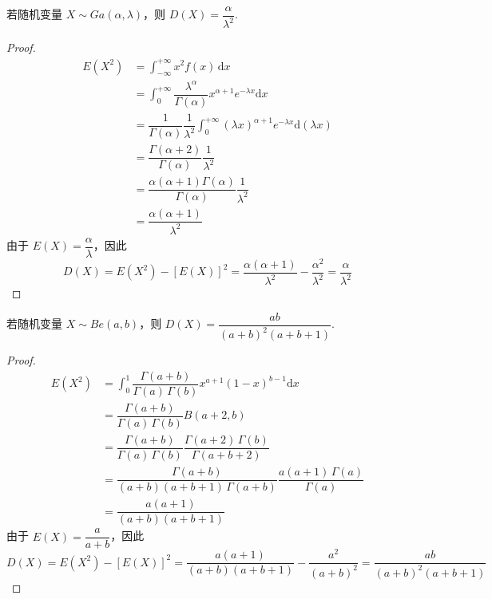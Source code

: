 \begin{conclusion}
    \indent 若随机变量 $X \sim Ga(\alpha,\lambda)$，则 $D(X) = \dfrac{\alpha}{\lambda^2}$.
\end{conclusion}

\begin{proof}
    $$
    \begin{aligned}
        E(X^2) &= \int_{-\infty}^{+\infty} x^2 f(x) \, \mathrm{d}x \\
        &= \int_{0}^{+\infty} \dfrac{\lambda^\alpha}{\Gamma(\alpha)} x^{\alpha + 1} e^{-\lambda x} \mathrm{d}x \\
        &= \dfrac{1}{\Gamma(\alpha)} \dfrac{1}{\lambda^2} \int_{0}^{+\infty} (\lambda x)^{\alpha + 1} e^{-\lambda x} \mathrm{d}(\lambda x) \\
        &= \dfrac{\Gamma(\alpha + 2)}{\Gamma(\alpha)} \dfrac{1}{\lambda^2} \\
        &= \dfrac{\alpha (\alpha + 1) \Gamma(\alpha)}{\Gamma(\alpha)} \dfrac{1}{\lambda^2} \\
        &= \dfrac{\alpha (\alpha + 1)}{\lambda^2}
    \end{aligned}
    $$
    由于 $E(X) = \dfrac{\alpha}{\lambda}$，因此
    $$
    D(X) = E(X^2) - [E(X)]^2 = \dfrac{\alpha (\alpha + 1)}{\lambda^2} - \dfrac{\alpha^2}{\lambda^2} = \dfrac{\alpha}{\lambda^2}
    $$
\end{proof}

\begin{conclusion}
    \indent 若随机变量 $X \sim Be(a,b)$，则 $D(X) = \dfrac{ab}{(a+b)^2 (a+b+1)}$.
\end{conclusion}

\begin{proof}
    $$
    \begin{aligned}
        E(X^2) &= \int_{0}^1 \dfrac{\Gamma(a+b)}{\Gamma(a) \, \Gamma(b)} x^{a+1} (1-x)^{b-1} \mathrm{d}x \\
        &= \dfrac{\Gamma(a+b)}{\Gamma(a) \, \Gamma(b)} B(a+2, b) \\
        &= \dfrac{\Gamma(a+b)}{\Gamma(a) \, \Gamma(b)} \dfrac{\Gamma(a+2) \, \Gamma(b)}{\Gamma(a+b+2)} \\
        &= \dfrac{\Gamma(a+b)}{(a+b)(a+b+1) \, \Gamma(a+b)} \dfrac{a(a+1) \, \Gamma(a)}{\Gamma(a)} \\
        &= \dfrac{a(a+1)}{(a+b)(a+b+1)}
    \end{aligned}
    $$
    由于 $E(X) = \dfrac{a}{a+b}$，因此
    $$
    D(X) = E(X^2) - [E(X)]^2 = \dfrac{a(a+1)}{(a+b)(a+b+1)} - \dfrac{a^2}{(a+b)^2} = \dfrac{ab}{(a+b)^2 (a+b+1)}
    $$
\end{proof}

